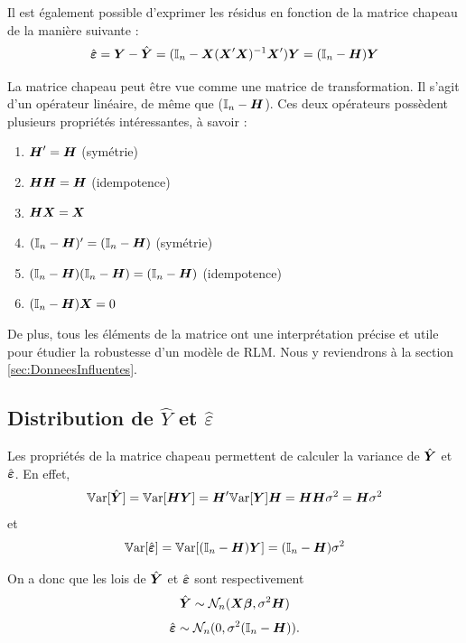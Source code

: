Il est également possible d'exprimer les résidus en fonction de la matrice chapeau de la manière suivante :
	\[\hboeps=\boY-\hY = (\boI_n- \boX(\boX'\boX)^{-1}\boX')\boY = (\boI_n-\boH)\boY
\]

La matrice chapeau peut être vue comme une matrice de transformation. Il s'agit d'un opérateur linéaire, de même que ($\boI_n-\boH$). Ces deux opérateurs possèdent plusieurs propriétés intéressantes, à savoir :

\begin{enumerate}
   \item $\boH'=\boH$ (symétrie)
	\item $\boH\boH=\boH$ (idempotence)
	\item $\boH\boX=\boX$
     \item $(\boI_n-\boH)'=(\boI_n-\boH)$ (symétrie)
	\item $(\boI_n-\boH)(\boI_n-\boH)=(\boI_n-\boH)$ (idempotence)
	\item $(\boI_n-\boH)\boX=0$
\end{enumerate}

De plus, tous les éléments de la matrice ont une interprétation précise et utile pour étudier la robustesse d'un modèle de RLM. Nous y reviendrons à la section \ref{sec:DonneesInfluentes}.


\subsection{Distribution de $\hat{Y}$ et $\hat{\varepsilon}$}
\label{sec:distYhatEps}

Les propriétés de la matrice chapeau permettent de calculer la variance de $\hY$ et $\hboeps$.
En effet,
\begin{eqnarray*}
	\var[\hY] = \var[\boH\boY]=\boH'\var[\boY]\boH= \boH\boH \sigma^2 = \boH \sigma^2
\end{eqnarray*}
et
\begin{eqnarray*}
	\var[\hboeps]=\var[(\boI_n-\boH)\boY]= (\boI_n-\boH)\sigma^2
\end{eqnarray*}

On a donc que les lois de $\hY$ et $\hboeps$ sont respectivement
\begin{eqnarray*}
	\hY \sim \N_n(\boX\bobeta, \sigma^2\boH)
\end{eqnarray*}
\begin{eqnarray}
	\hboeps \sim \N_n(0, \sigma^2(\boI_n-\boH)).
	\label{distepsilon}
\end{eqnarray}


